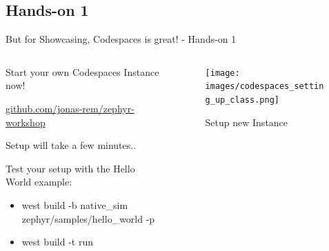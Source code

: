 \documentclass[10pt, aspectratio=169]{beamer}
\begin{document}
\subsection{Hands-on 1}
\begin{frame}[fragile]{But for Showcasing, Codespaces is great! - Hands-on 1}
  \begin{columns}
    \begin{column}{0.6\textwidth}
            Start your own Codespaces Instance now! \footnotemark[1] \footnotemark[2]

      \href{https://github.com/jonas-rem/zephyr-workshop}{github.com/jonas-rem/zephyr-workshop}

      Setup will take a few minutes..

      Test your setup with the Hello World example:
      \begin{itemize}
        \item \scriptsize west build -b native\_sim zephyr/samples/hello\_world -p
        \item \scriptsize west build -t run
      \end{itemize}
    \end{column}
    \begin{column}{0.4\textwidth}
      \begin{figure}
        \texttt{[image: images/codespaces\_setting\_up\_class.png]}
        \caption*{Setup new Instance}
      \end{figure}
    \end{column}
  \end{columns}
\end{frame}
\end{document}
